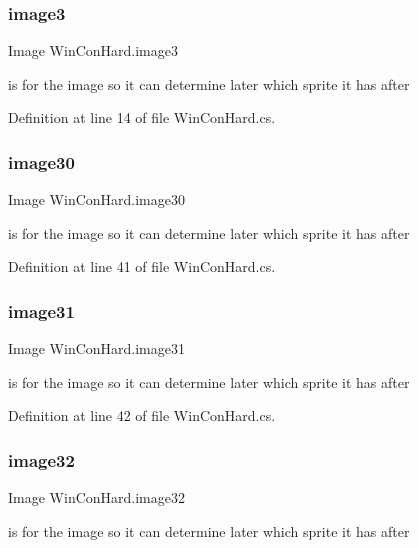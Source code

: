 \subsubsection{\texorpdfstring{image3}{image3}}
{\footnotesize\ttfamily Image Win\+Con\+Hard.\+image3}

is for the image so it can determine later which sprite it has after 

Definition at line 14 of file Win\+Con\+Hard.\+cs.

\mbox{\label{class_win_con_hard_ac55df3891e72d846f2bf92e72c86f7c2}} 
\subsubsection{\texorpdfstring{image30}{image30}}
{\footnotesize\ttfamily Image Win\+Con\+Hard.\+image30}

is for the image so it can determine later which sprite it has after 

Definition at line 41 of file Win\+Con\+Hard.\+cs.

\mbox{\label{class_win_con_hard_aac880f4a5926f496123f05e43eb1d8cb}} 
\subsubsection{\texorpdfstring{image31}{image31}}
{\footnotesize\ttfamily Image Win\+Con\+Hard.\+image31}

is for the image so it can determine later which sprite it has after 

Definition at line 42 of file Win\+Con\+Hard.\+cs.

\mbox{\label{class_win_con_hard_ac4950176f13c5ca8b03a8999b30b30a0}} 
\subsubsection{\texorpdfstring{image32}{image32}}
{\footnotesize\ttfamily Image Win\+Con\+Hard.\+image32}

is for the image so it can determine later which sprite it has after 


